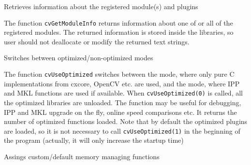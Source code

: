 \label{GetModuleInfo}

Retrieves information about the registered module(s) and plugins


\begin{description}
\end{description}

The function \texttt{cvGetModuleInfo} returns information about one of or
all of the registered modules. The returned information is stored inside
the libraries, so user should not deallocate or modify the returned
text strings.

\label{UseOptimized}

Switches between optimized/non-optimized modes


\begin{description}
\end{description}

The function \texttt{cvUseOptimized} switches between the mode, where
only pure C implementations from cxcore, OpenCV etc. are used, and
the mode, where IPP and MKL functions are used if available. When
\texttt{cvUseOptimized(0)} is called, all the optimized libraries are
unloaded. The function may be useful for debugging, IPP and MKL upgrade on
the fly, online speed comparisons etc. It returns the number of optimized
functions loaded. Note that by default the optimized plugins are loaded,
so it is not necessary to call \texttt{cvUseOptimized(1)} in the beginning of
the program (actually, it will only increase the startup time)

\label{SetMemoryManager}

Assings custom/default memory managing functions

